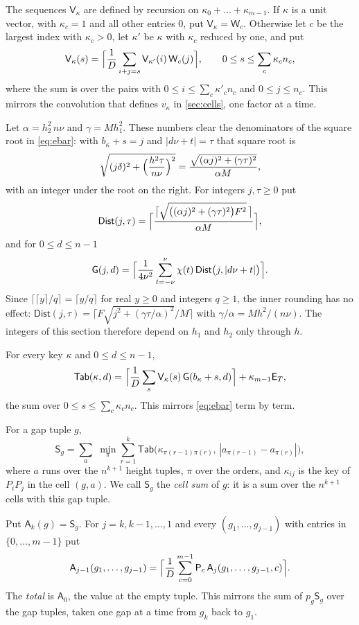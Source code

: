 The sequences $\mathsf{V}_\kappa$ are defined by recursion on $\kappa_0+\dots+\kappa_{m-1}$. If $\kappa$ is a unit vector, with $\kappa_c=1$ and all other entries $0$, put $\mathsf{V}_\kappa=\mathsf{W}_c$. Otherwise let $c$ be the largest index with $\kappa_c>0$, let $\kappa'$ be $\kappa$ with $\kappa_c$ reduced by one, and put
\[
\mathsf{V}_\kappa(s)=\Bigl\lceil\frac1D\sum_{i+j=s}\mathsf{V}_{\kappa'}(i)\,\mathsf{W}_c(j)\Bigr\rceil,\qquad 0\le s\le\sum_c\kappa_cn_c ,
\]
where the sum is over the pairs with $0\le i\le\sum_c\kappa'_cn_c$ and $0\le j\le n_c$. This mirrors the convolution that defines $v_\kappa$ in \cref{sec:cells}, one factor at a time.

 Let $\alpha=h_2^2\,n\nu$ and $\gamma=Mh_1^2$. These numbers clear the denominators of the square root in \eqref{eq:ebar}: with $b_\kappa+s=j$ and $|d\nu+t|=\tau$ that square root is
\[
\sqrt{(j\delta)^2+\Bigl(\frac{h^2\tau}{n\nu}\Bigr)^2}=\frac{\sqrt{(\alpha j)^2+(\gamma\tau)^2}}{\alpha M},
\]
with an integer under the root on the right. For integers $j,\tau\ge0$ put
\[
\mathsf{Dist}(j,\tau)=\Bigl\lceil\frac{\bigl\lceil\sqrt{\bigl((\alpha j)^2+(\gamma\tau)^2\bigr)F^2}\,\bigr\rceil}{\alpha M}\Bigr\rceil ,
\]
and for $0\le d\le n-1$
\[
\mathsf{G}(j,d)=\Bigl\lceil\frac{1}{4\nu^2}\sum_{t=-\nu}^{\nu}\chi(t)\,\mathsf{Dist}\bigl(j,|d\nu+t|\bigr)\Bigr\rceil .
\]
Since $\lceil\lceil y\rceil/q\rceil=\lceil y/q\rceil$ for real $y\ge0$ and integers $q\ge1$, the inner rounding has no effect: $\mathsf{Dist}(j,\tau)=\lceil F\sqrt{j^2+(\gamma\tau/\alpha)^2}/M\rceil$ with $\gamma/\alpha=Mh^2/(n\nu)$. The integers of this section therefore depend on $h_1$ and $h_2$ only through $h$.

 For every key $\kappa$ and $0\le d\le n-1$,
\[
\mathsf{Tab}(\kappa,d)=\Bigl\lceil\frac1D\sum_{s}\mathsf{V}_\kappa(s)\,\mathsf{G}(b_\kappa+s,d)\Bigr\rceil+\kappa_{m-1}\mathsf{E}_T ,
\]
the sum over $0\le s\le\sum_c\kappa_cn_c$. This mirrors \eqref{eq:ebar} term by term.

 For a gap tuple $g$,
\[
\mathsf{S}_g=\sum_{a}\;\min_\pi\sum_{r=1}^{k}\mathsf{Tab}\bigl(\kappa_{\pi(r-1)\pi(r)},\,|a_{\pi(r-1)}-a_{\pi(r)}|\bigr),
\]
where $a$ runs over the $n^{k+1}$ height tuples, $\pi$ over the orders, and $\kappa_{ij}$ is the key of $P_iP_j$ in the cell $(g,a)$. We call $\mathsf{S}_g$ the \emph{cell sum} of $g$: it is a sum over the $n^{k+1}$ cells with this gap tuple.

 Put $\mathsf{A}_k(g)=\mathsf{S}_g$. For $j=k,k-1,\dots,1$ and every $(g_1,\dots,g_{j-1})$ with entries in $\{0,\dots,m-1\}$ put
\[
\mathsf{A}_{j-1}(g_1,\dots,g_{j-1})=\Bigl\lceil\frac1D\sum_{c=0}^{m-1}\mathsf{P}_c\,\mathsf{A}_j(g_1,\dots,g_{j-1},c)\Bigr\rceil .
\]
The \emph{total} is $\mathsf{A}_0$, the value at the empty tuple. This mirrors the sum of $p_g\mathsf{S}_g$ over the gap tuples, taken one gap at a time from $g_k$ back to $g_1$.

